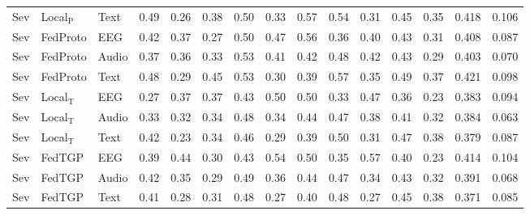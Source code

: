 \begin{longtable}{lllcccccccccccc}
Sev & Local$_{\mathrm{P}}$ & Text & 0.49 & 0.26 & 0.38 & 0.50 & 0.33 & 0.57 & 0.54 & 0.31 & 0.45 & 0.35 & 0.418 & 0.106 \\
Sev & FedProto & EEG & 0.42 & 0.37 & 0.27 & 0.50 & 0.47 & 0.56 & 0.36 & 0.40 & 0.43 & 0.31 & 0.408 & 0.087 \\
Sev & FedProto & Audio & 0.37 & 0.36 & 0.33 & 0.53 & 0.41 & 0.42 & 0.48 & 0.42 & 0.43 & 0.29 & 0.403 & 0.070 \\
Sev & FedProto & Text & 0.48 & 0.29 & 0.45 & 0.53 & 0.30 & 0.39 & 0.57 & 0.35 & 0.49 & 0.37 & 0.421 & 0.098 \\
Sev & Local$_{\mathrm{T}}$ & EEG & 0.27 & 0.37 & 0.37 & 0.43 & 0.50 & 0.50 & 0.33 & 0.47 & 0.36 & 0.23 & 0.383 & 0.094 \\
Sev & Local$_{\mathrm{T}}$ & Audio & 0.33 & 0.32 & 0.34 & 0.48 & 0.34 & 0.44 & 0.47 & 0.38 & 0.41 & 0.32 & 0.384 & 0.063 \\
Sev & Local$_{\mathrm{T}}$ & Text & 0.42 & 0.23 & 0.34 & 0.46 & 0.29 & 0.39 & 0.50 & 0.31 & 0.47 & 0.38 & 0.379 & 0.087 \\
Sev & FedTGP & EEG & 0.39 & 0.44 & 0.30 & 0.43 & 0.54 & 0.50 & 0.35 & 0.57 & 0.40 & 0.23 & 0.414 & 0.104 \\
Sev & FedTGP & Audio & 0.42 & 0.35 & 0.29 & 0.49 & 0.36 & 0.44 & 0.47 & 0.34 & 0.43 & 0.32 & 0.391 & 0.068 \\
Sev & FedTGP & Text & 0.41 & 0.28 & 0.31 & 0.48 & 0.27 & 0.40 & 0.48 & 0.27 & 0.45 & 0.38 & 0.371 & 0.085 \\
\bottomrule
\end{longtable}